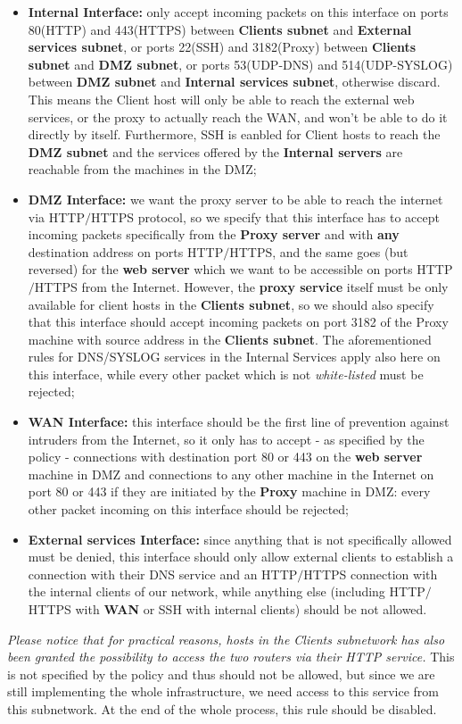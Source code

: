 \begin{itemize}
\item \textbf{Internal Interface:} only accept incoming packets on this interface on ports 80(HTTP) and 443(HTTPS) between \textbf{Clients subnet} and \textbf{External services subnet}, or ports 22(SSH) and 3182(Proxy) between \textbf{Clients subnet} and \textbf{DMZ subnet}, or ports 53(UDP-DNS) and 514(UDP-SYSLOG) between \textbf{DMZ subnet} and \textbf{Internal services subnet}, otherwise discard. This means the Client host will only be able to reach the external web services, or the proxy to actually reach the WAN, and won't be able to do it directly by itself. Furthermore, SSH is eanbled for Client hosts to reach the \textbf{DMZ subnet} and the services offered by the \textbf{Internal servers} are reachable from the machines in the DMZ;
\item \textbf{DMZ Interface:} we want the proxy server to be able to reach the internet via HTTP$/$HTTPS protocol, so we specify that this interface has to accept incoming packets specifically from the \textbf{Proxy server} and with \textbf{any} destination address on ports HTTP$/$HTTPS, and the same goes (but reversed) for the \textbf{web server} which we want to be accessible on ports HTTP$/$HTTPS from the Internet. However, the \textbf{proxy service} itself must be only available for client hosts in the \textbf{Clients subnet}, so we should also specify that this interface should accept incoming packets on port 3182 of the Proxy machine with source address in the \textbf{Clients subnet}. The aforementioned rules for DNS/SYSLOG services in the Internal Services apply also here on this interface, while every other packet which is not \textit{white-listed} must be rejected;
\item \textbf{WAN Interface:} this interface should be the first line of prevention against intruders from the Internet, so it only has to accept - as specified by the policy - connections with destination port 80 or 443 on the \textbf{web server} machine in DMZ and connections to any other machine in the Internet on port 80 or 443 if they are initiated by the \textbf{Proxy} machine in DMZ: every other packet incoming on this interface should be rejected;
\item \textbf{External services Interface:} since anything that is not specifically allowed must be denied, this interface should only allow external clients to establish a connection with their DNS service and an HTTP$/$HTTPS connection with the internal clients of our network, while anything else (including HTTP$/$HTTPS with \textbf{WAN} or SSH with internal clients) should be not allowed.
\end{itemize}

\textit{Please notice that for practical reasons, hosts in the Clients subnetwork has also been granted the possibility to access the two routers via their HTTP service.} This is not specified by the policy and thus should not be allowed, but since we are still implementing the whole infrastructure, we need access to this service from this subnetwork. At the end of the whole process, this rule should be disabled.
